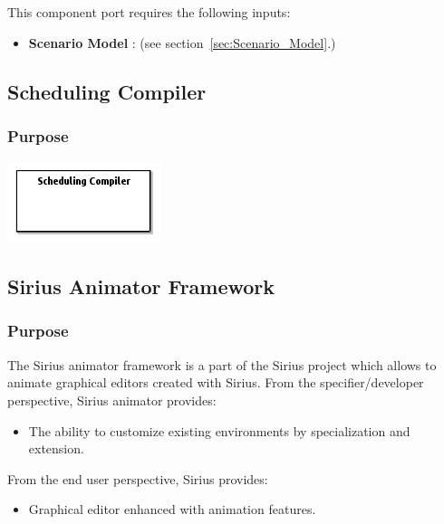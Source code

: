 \documentclass{gemoc} %
\begin{document}
This component port requires the following inputs:
\begin{itemize}
  \item \textbf{Scenario Model} :
(see section~\ref{sec:Scenario_Model}.)
\end{itemize}



\subsection{Scheduling Compiler}
\label{sec:Scheduling_Compiler}


\subsubsection{Purpose}


\begin{center}
\includegraphics*[trim=0.0cm 0.0cm 0cm 0.0cm, clip=true]{../images/generated/Generated_Scheduling_Compiler.png}
\end{center}




\subsection{Sirius Animator Framework}
\label{sec:Sirius_Animator_Framework}


\subsubsection{Purpose}
The Sirius animator framework is a part of the Sirius project which allows to animate graphical editors created with Sirius.
From the specifier/developer perspective, Sirius animator provides:
\begin{itemize}
\item The ability to customize existing environments by specialization and extension.
\end{itemize}
From the end user perspective, Sirius provides:
\begin{itemize}
\item Graphical editor enhanced with animation features.
\end{itemize}
\end{document}
